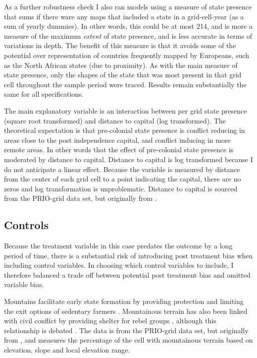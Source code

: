 \documentclass[12pt]{article}
\begin{document}
As a further robustness check I also ran models using a measure of state
presence that sums if there ware any maps that included a state in a
grid-cell-year (as a sum of yearly dummies). In other words, this could be at
most 214, and is more a measure of the maximum \textit{extent} of state
presence, and is less accurate in terms of variations in depth. The benefit of
this measure is that it avoids some of the potential over representation of
countries frequently mapped by Europeans, such as the North African states (due
to proximity). As with the main measure of state presence, only the shapes of
the state that was most present in that grid cell throughout the sample period
were traced. Results remain substantially the same for all specifications.

The main explanatory variable is an interaction between per grid state presence
(square root transformed) and distance to capital (log transformed). The
theoretical expectation is that pre-colonial state presence is conflict reducing
in areas close to the post independence capital, and conflict inducing in more
remote areas. In other words that the effect of pre-colonial state presence is
moderated by distance to capital. Distance to capital is log transformed because
I do not anticipate a linear effect. Because the variable is measured by
distance from the center of each grid cell to a point indicating the capital,
there are no zeros and log transformation is unproblematic. Distance to capital
is sourced from the PRIO-grid data set, but originally from
\citet{Weidmann2010a}.

\subsection{Controls} \label{Controls}

Because the treatment variable in this case predates the outcome by a long
period of time, there is a substantial risk of introducing post treatment bias
when including control variables. In choosing which control variables to
include, I therefore balanced a trade off between potential post treatment bias
and omitted variable bias. 

Mountains facilitate early state formation by providing protection and limiting the
exit options of sedentary farmers \citep{Carneiro1988}. Mountainous terrain has
also been linked with civil conflict by providing shelter for rebel groups
\citep{Hegre2006}, although this relationship is debated \citep{Buhaug2002}. The
data is from the PRIO-grid data set, but originally from \citet{Blyth2002}, and
measures the percentage of the cell with mountainous terrain based on elevation,
slope and local elevation range.
\end{document}

